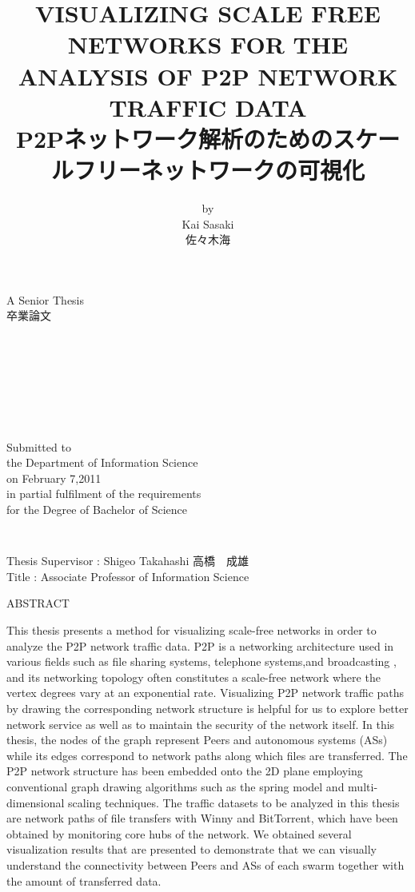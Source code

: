 \documentclass{jsarticle}
\title{VISUALIZING SCALE FREE NETWORKS FOR THE ANALYSIS OF P2P NETWORK TRAFFIC DATA\\ P2Pネットワーク解析のためのスケールフリーネットワークの可視化}
\author{by \\ Kai Sasaki \\ 佐々木海}
\date{}
\begin{document}
 \maketitle
 \begin{center} \Large{A Senior Thesis \\ 卒業論文}\end{center}
\begin{verbatim}








\end{verbatim}

 \begin{center} \Large{Submitted to \\ the Department of Information Science \\ on February 7,2011\\ in partial fulfilment of the requirements \\ for the Degree of Bachelor of Science}\end{center}
 \begin{verbatim}
 
 \end{verbatim}
 
 \begin{center}
 \Large{Thesis Supervisor : Shigeo Takahashi 高橋　成雄\\ Title : Associate Professor of Information Science}
 \end{center}
 
 \newpage
\begin{center} \LARGE{ABSTRACT} \end{center}
This thesis presents a method for visualizing scale-free networks in order to analyze the P2P network traffic data. P2P is a networking architecture used in various fields such as file sharing systems, telephone systems,and broadcasting , and its networking topology often constitutes a scale-free network where the vertex degrees vary at an exponential rate. Visualizing P2P network traffic paths by drawing the corresponding network structure is helpful for us to explore better network service as well as to maintain the security of the network itself. In this thesis, the nodes of the graph represent Peers and autonomous systems (ASs) while its edges correspond to network paths along which files are
transferred. The P2P network structure has been embedded onto the 2D plane employing conventional graph drawing algorithms such as the spring model
and multi-dimensional scaling techniques. The traffic datasets to be analyzed in this thesis are network paths of file transfers with Winny and BitTorrent, which have been obtained by monitoring core hubs of the network. We obtained several visualization results that are presented to demonstrate that we can visually understand the connectivity between Peers and ASs of each swarm together with the amount of transferred data.
\\
\end{document}

